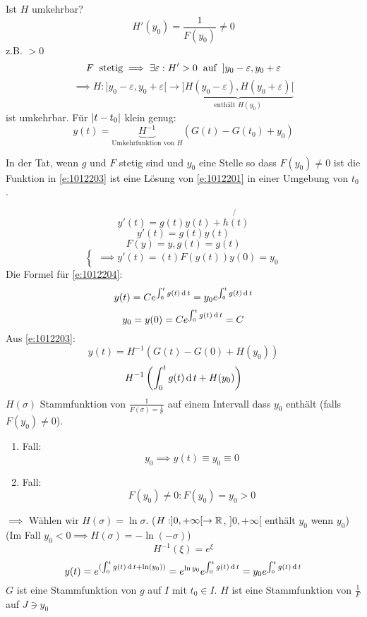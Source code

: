 \begin{Def}
\begin{enumerate}
      Ist $H$ umkehrbar?
      \[H'(y_0)=\frac{1}{F(y_0)}\neq 0\]
      z.B. $>0$
      \[F\hspace{2mm}\text{stetig}\implies \exists \varepsilon: H'>0\hspace{2mm}\text{auf}\hspace{2mm} ]y_0-\varepsilon,y_0+\varepsilon\]
      \[\implies H:]y_0-\varepsilon,y_0+\varepsilon [\to\underbrace{ ]H(y_0-\varepsilon),H(y_0+\varepsilon) [ }_{\text{enthält $H(y_0)$}}\]
      ist umkehrbar.
      Für $\mathopen| t-t_0 \mathclose|$ klein genug:
      \begin{equation}
        \label{e:1012203}
        y(t)=\underbrace{H^{-1}}_{\text{Umkehrfunktion von $H$}}(G(t)-G(t_0)+y_0)
      \end{equation}
  \end{enumerate}
  \begin{Bem}
    In der Tat, wenn $g$ und $F$ stetig sind und $y_0$ eine Stelle so dass $F(y_0)\neq 0$ ist die Funktion in \ref{e:1012203} ist eine Lösung von \ref{e:1012201} in einer Umgebung von $t_0$.
  \end{Bem}
  \[y'(t)=g(t)y(t)+\not{h(t)}\]
  \[y'(t)=g(t)y(t)\]
  \[F(y)=y, g(t)=g(t)\]
  \begin{equation}
    \label{e:1012204}
    \begin{cases}
      \implies y'(t)=(t)F(y(t))
      y(0)=y_0
    \end{cases}
  \end{equation}
  Die Formel für \ref{e:1012204}:
  \[y(t)=Ce^{\int_0^tg(t)\operatorname{d} t}=y_0e^{\int_0^tg(t)\operatorname{d} t}\]
  \[y_0=y(0)=Ce^{\int_0^tg(t)\operatorname{d} t}=C\]
  Aus \ref{e:1012203}:
  \[y(t)=H^{-1}\left( G(t)-G(0)+H(y_0) \right)\]
  \[H^{-1}\left( \int_0^t g(t)\operatorname{d} t+H(y_0) \right)\]
  $H(\sigma)$ Stammfunktion von $\frac{1}{F(\sigma)=\frac{1}{\sigma}}$ auf einem Intervall dass $y_0$ enthält (falls $F(y_0)\neq 0$). 
  \begin{enumerate}
    \item Fall:
      \[y_0\implies y(t)\equiv y_0\equiv 0\]
    \item Fall:
      \[F(y_0)\neq 0: F(y_0)=y_0>0\]
  \end{enumerate}
  $\implies$ Wählen wir $H(\sigma)=\ln \sigma$. ($H:]0,+\infty [\to\mathbb{R}$, $]0,+\infty [$ enthält $y_0$ wenn $y_0$) (Im Fall $y_0<0\implies H(\sigma)=-\ln(-\sigma)$)
  \[H^{-1}(\xi)=e^{\xi}\]
  \[y(t)=e^{(\int_0^tg(t)\operatorname{d} t+\ln(y_0))}=e^{\ln y_0}e^{\int_0^tg(t)\operatorname{d} t}=y_0e^{\int_0^tg(t)\operatorname{d} t}\]
  $G$ ist eine Stammfunktion von $g$ auf $I$ mit $t_0\in I$. $H$ ist eine Stammfunktion von $\frac{1}{F}$ auf $J\ni y_0$
\end{Def}
